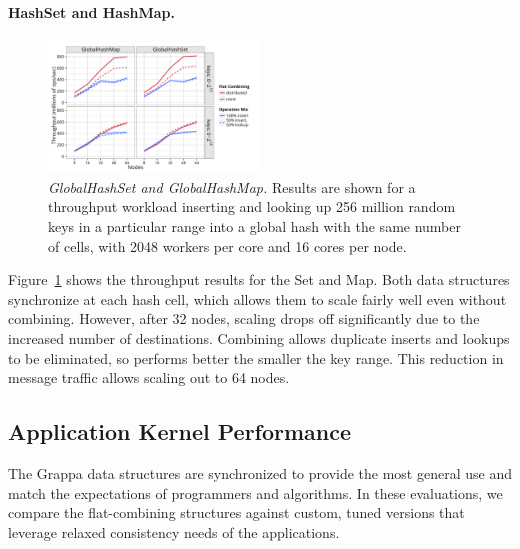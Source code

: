 \paragraph{HashSet and HashMap.}
\begin{figure}[t]
  \centering
  \includegraphics[width=0.5\textwidth]{data/plots/hash_perf.pdf}
  \caption{\emph{GlobalHashSet and GlobalHashMap.}
    Results are shown for a throughput workload inserting and looking up 256 million random keys in a particular range into a global hash with the same number of cells, with 2048 workers per core and 16 cores per node.
  }
  \label{fig:hash_perf}
\end{figure}

Figure~\ref{fig:hash_perf} shows the throughput results for the Set and Map.
Both data structures synchronize at each hash cell, which allows them to scale fairly well even without combining. However, after 32 nodes, scaling drops off significantly due to the increased number of destinations.
Combining allows duplicate inserts and lookups to be eliminated, so performs better the smaller the key range. This reduction in message traffic allows scaling out to 64 nodes.

\subsection{Application Kernel Performance}
The Grappa data structures are synchronized to provide the most general use and match the expectations of programmers and algorithms.
In these evaluations, we compare the flat-combining structures against custom, tuned versions that leverage relaxed consistency needs of the applications.

